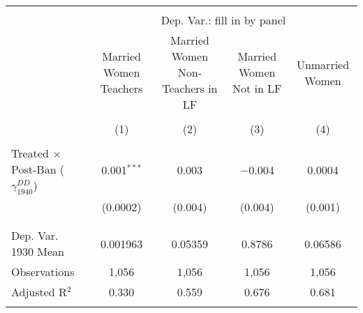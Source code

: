 
\begin{tabular}{@{\extracolsep{5pt}}lcccc} 
\\[-1.8ex]\hline 
\hline \\[-1.8ex] 
 & \multicolumn{4}{c}{Dep. Var.: fill in by panel} \\ 
\cline{2-5} 
 & Married Women Teachers & Married Women Non-Teachers in LF & Married Women Not in LF & Unmarried Women \\ 
\\[-1.8ex] & (1) & (2) & (3) & (4)\\ 
\hline \\[-1.8ex] 
 Treated $\times$ Post-Ban ($\gamma_{1940}^{DD}$) & 0.001$^{***}$ & 0.003 & $-$0.004 & 0.0004 \\ 
  & (0.0002) & (0.004) & (0.004) & (0.001) \\ 
  & & & & \\ 
\hline \\[-1.8ex] 
Dep. Var. 1930 Mean & 0.001963 & 0.05359 & 0.8786 & 0.06586 \\ 
Observations & 1,056 & 1,056 & 1,056 & 1,056 \\ 
Adjusted R$^{2}$ & 0.330 & 0.559 & 0.676 & 0.681 \\ 
\hline 
\hline \\[-1.8ex] 
\end{tabular} 
